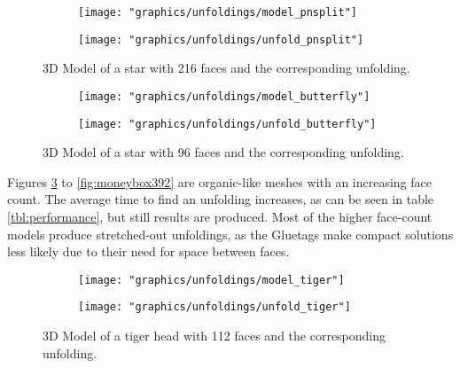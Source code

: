 \documentclass[draft,final]{vutinfth} %
\begin{document}
\begin{figure}
  \begin{subfigure}[b]{0.5\textwidth}
    \texttt{[image: "graphics/unfoldings/model\_pnsplit"]}
  \end{subfigure}
  \begin{subfigure}[b]{0.5\textwidth}
    \texttt{[image: "graphics/unfoldings/unfold\_pnsplit"]}
  \end{subfigure}
  
  \caption{3D Model of a star with 216 faces and the corresponding unfolding.}
  \label{fig:pnsplit}
\end{figure}

\begin{figure}
  \begin{subfigure}[b]{0.5\textwidth}
    \texttt{[image: "graphics/unfoldings/model\_butterfly"]}
  \end{subfigure}
  \begin{subfigure}[b]{0.5\textwidth}
    \texttt{[image: "graphics/unfoldings/unfold\_butterfly"]}
  \end{subfigure}
  
  \caption{3D Model of a star with 96 faces and the corresponding unfolding.}
  \label{fig:butterfly}
\end{figure}

\newpage

Figures \ref{fig:tiger} to \ref{fig:moneybox392} are organic-like meshes with an increasing face count. The average time to find an unfolding increases, as can be seen in table \ref{tbl:performance}, but still results are produced. Most of the higher face-count models produce stretched-out unfoldings, as the Gluetags make compact solutions less likely due to their need for space between faces.

\begin{figure}
  \begin{subfigure}[b]{0.5\textwidth}
    \texttt{[image: "graphics/unfoldings/model\_tiger"]}
  \end{subfigure}
  \begin{subfigure}[b]{0.5\textwidth}
    \texttt{[image: "graphics/unfoldings/unfold\_tiger"]}
  \end{subfigure}
  
  \caption{3D Model of a tiger head with 112 faces and the corresponding unfolding.}
  \label{fig:tiger}
\end{figure}
\end{document}
